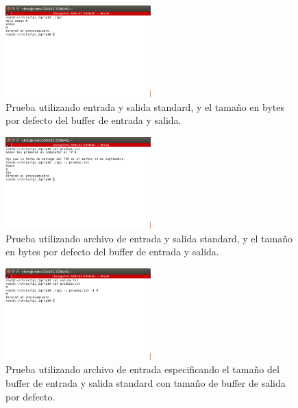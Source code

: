 \documentclass[a4paper]{article}
\begin{document}
\begin{figure}[!htp]
\begin{center}
\includegraphics[width=0.5\textwidth]{imagenes_casosDePrueba_tp1/prueba0.png}
\caption{Prueba utilizando entrada y salida standard, y el tamaño en bytes por defecto del buffer de entrada y salida.} \label{fig001}
\end{center}
\end{figure}

\begin{figure}[!htp]
\begin{center}
\includegraphics[width=0.5\textwidth]{imagenes_casosDePrueba_tp1/prueba_1archivoDeEntrada.png}
\caption{Prueba utilizando archivo de entrada y salida standard, y el tamaño en bytes por defecto del buffer de entrada y salida.} \label{fig001}
\end{center}
\end{figure}

\begin{figure}[!htp]
\begin{center}
\includegraphics[width=0.5\textwidth]{imagenes_casosDePrueba_tp1/prueba2_entrada_4.png}
\caption{Prueba utilizando archivo de entrada especificando el tamaño del buffer de entrada y salida standard con tamaño de buffer de salida por defecto.} \label{fig001}
\end{center}
\end{figure}
\end{document}
